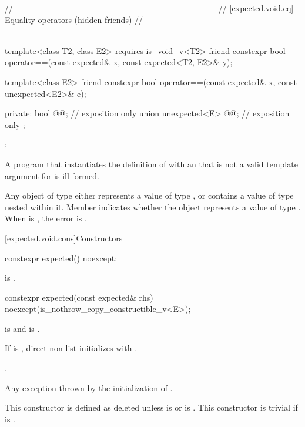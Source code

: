 \begin{codeblock}
{  // -------------------------------------------------------------------------
  // [expected.void.eq] Equality operators (hidden friends)
  // -------------------------------------------------------------------------

  template<class T2, class E2>
    requires is_void_v<T2>
  friend constexpr bool operator==(const expected& x, const expected<T2, E2>& y);

  template<class E2>
  friend constexpr bool operator==(const expected& x, const unexpected<E2>& e);

private:
  bool @@; // exposition only
  union {
    unexpected<E> @@; // exposition only
  };
};
\end{codeblock}

\begin{itemdescr}
\pnum
\mandates
A program that instantiates the definition of  with an  that is not a valid template argument for  is ill-formed.

\pnum
\remarks
Any object of type  either represents a value of type , or contains a value of type  nested within it. Member  indicates whether the  object represents a value of type . When  is , the error is .
\end{itemdescr}

[expected.void.cons]{Constructors}

%
\begin{itemdecl}
constexpr expected() noexcept;
\end{itemdecl}

\begin{itemdescr}
\pnum
\ensures
{} is .
\end{itemdescr}

%
\begin{itemdecl}
constexpr expected(const expected& rhs) noexcept(is_nothrow_copy_constructible_v<E>);
\end{itemdecl}

\begin{itemdescr}
\pnum
\constraints
{} is  and  is .

\pnum
\effects
If  is , direct-non-list-initializes  with .

\pnum
\ensures
{}.

\pnum
\throws
Any exception thrown by the initialization of .

\pnum
\remarks
This constructor is defined as deleted unless  is  or  is . This constructor is trivial if  is .
\end{itemdescr}

